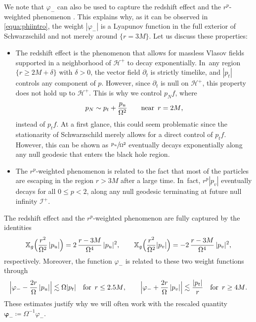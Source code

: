 \documentclass[JEP,XML,SOM,Unicode,published]{cedram}
\theoremstyle{plain}
\theoremstyle{definition}
\newcommand\T{{\mathbb{X}}}
\renewcommand\H{{\mathcal{H}^+}}
\begin{document}
We note that $\varphi_-$ can also be used to capture the redshift effect \cite{DR09} and the $r^p$-weighted phenomenon \cite{DR10}. This explains why, as it can be observed in \eqref{equa:phiintro}, the weight $|\varphi_-|$ is a Lyapunov function in the full exterior of Schwarzschild and not merely around $\{r=3M\}$. Let us discuss these properties:
\begin{itemize}
\item The redshift effect is the phenomenon that allows for massless Vlasov fields supported in a neighborhood of $\mathcal{H}^+$ to decay exponentially. In~any region $\{r \geq 2M+\delta\}$ with $\delta>0$, the vector field $\partial_t$ is strictly timelike, and $|p_t|$ controls any component of $p$. However, since $\partial_t$ is null on $\mathcal{H}^+$, this property does not hold up to $\H$. This is why we control $p_N f$, where
\[
p_N \sim p_t+\frac{p_u}{\Omega^2} \qquad \text{near \,$r=2M$,}
\]
instead of $p_t f$. At a first glance, this could seem problematic since the stationarity of Schwarzschild merely allows for a direct control of $p_t f$. However, this can be shown as $\sfrac{p_u}{\Omega^2}$ eventually decays exponentially along any null geodesic that enters the black hole region.
\item The $r^p$-weighted phenomenon is related to the fact that most of the particles are escaping in the region $r > 3M$ after a large time. In~fact, $r^p |p_v|$ eventually decays for all $0 \leq p <2$, along any null geodesic terminating at future null infinity $\mathcal{I}^+$.
\end{itemize}

The redshift effect and the $r^p$-weighted phenomenon are fully captured by the identities
\begin{align*}
\T_g \Bigl(\frac{r^2}{\Omega^2}\, |p_u| \Bigr) = 2\,\frac{r-3M}{\Omega^4}\,|p_u|^2,\qquad \T_g \Bigl(\frac{r^2}{\Omega^2} |p_v| \Bigr) = -2\,\frac{r-3M}{\Omega^4}\,|p_v|^2,
\end{align*}
respectively. Moreover, the function $\varphi_-$ is related to these two weight functions through
\begin{align*}
\Big|\varphi_-- \frac{2r}{\Omega}\,|p_u| \Big| \lesssim \Omega |p_t| \quad \text{for \,$r \leq 2.5M$},\qquad \Big| \varphi_-+\frac{2r}{\Omega}\,|p_v|\Big| \lesssim \frac{|p_t|}{r} \quad \text{for \,$r \geq 4M$}.
\end{align*}
These estimates justify why we will often work with the rescaled quantity $\pmb{\varphi}_- \coloneqq \Omega^{-1} \varphi_-$.
\end{document}
